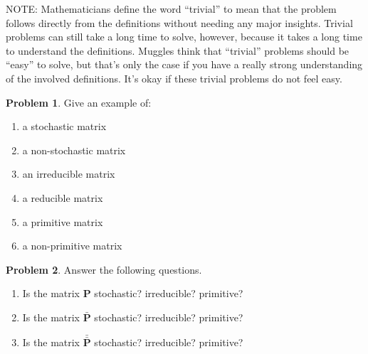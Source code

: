 \documentclass[10pt]{article}
\theoremstyle{definition}
\newtheorem{problem}{Problem}
\newcommand{\p}{\mathbf P}
\newcommand{\pb}{\bar {\p}}
\newcommand{\pbb}{\bar {\pb}}
\begin{document}
NOTE:
Mathematicians define the word ``trivial'' to mean that the problem follows directly from the definitions without needing any major insights.
Trivial problems can still take a long time to solve, however, because it takes a long time to understand the definitions.
Muggles think that ``trivial'' problems should be ``easy'' to solve,
but that's only the case if you have a really strong understanding of the involved definitions.
It's okay if these trivial problems do not feel easy.

\begin{problem}
    Give an example of:
    \begin{enumerate}
        \item a stochastic matrix
            \vspace{4in}
        \item a non-stochastic matrix
            \vspace{4in}
            \newpage
        \item an irreducible matrix
            \vspace{4in}
        \item a reducible matrix
            \vspace{4in}
            \newpage
        \item a primitive matrix
            \vspace{4in}
        \item a non-primitive matrix
    \end{enumerate}
\end{problem}

\newpage
\begin{problem}
    Answer the following questions.
    \begin{enumerate}
        \item 
            Is the matrix $\p$ stochastic? irreducible? primitive?
            \vspace{3in}
        \item 
            Is the matrix $\pb$ stochastic? irreducible? primitive?
            \vspace{3in}
        \item 
            Is the matrix $\pbb$ stochastic? irreducible? primitive?
            \vspace{3in}
    \end{enumerate}
\end{problem}
\end{document}
